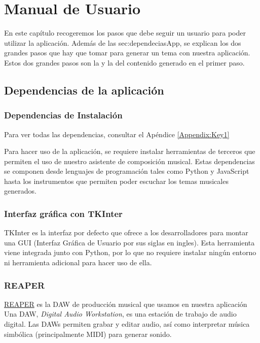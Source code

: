\chapter{Manual de Usuario}
\label{cap:descripcionTrabajo}

En este capítulo recogeremos los pasos que debe seguir un usuario para poder utilizar la aplicación. Además de las \refname{sec:dependeciasApp}, se explican los dos grandes pasos que hay que tomar para generar un tema con nuestra aplicación. 
Estos dos grandes pasos son la  y la  del contenido generado en el primer paso. 

\section{Dependencias de la aplicación}
\label{sec:dependeciasApp}
\subsection{Dependencias de Instalación}
	Para ver todas las dependencias, consultar el Apéndice \ref{Appendix:Key1}

	Para hacer uso de la aplicación, se requiere instalar herramientas de terceros que permiten el uso de nuestro asistente de composición musical.
	Estas dependencias se componen desde lenguajes de programación tales como Python y JavaScript hasta los instrumentos que permiten poder escuchar los temas musicales generados.

\subsection{Interfaz gráfica con TKInter}
	TKInter es la interfaz por defecto que \PythonLink{} ofrece a los desarrolladores para montar una 
    GUI (Interfaz Gráfica de Usuario por sus siglas en ingles).
	Esta herramienta viene integrada junto con Python, por lo que no requiere instalar ningún entorno ni herramienta adicional para hacer uso de ella.

\subsection{REAPER}
\label{subsec:manual-reaper}
	\href{https://www.reaper.fm/}{REAPER} es la DAW de producción musical que usamos en nuestra aplicación
	Una DAW, \textit{Digital Audio Workstation}, es una estación de trabajo de audio digital. Las DAWs permiten grabar y editar audio, así como interpretar música simbólica (principalmente MIDI) para generar sonido.

